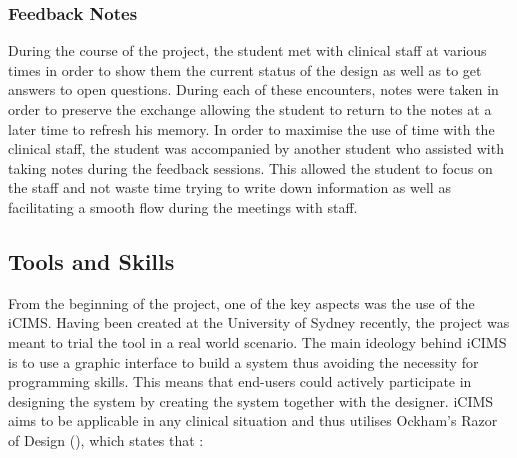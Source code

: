 \subsubsection{Feedback Notes}
During the course of the project, the student met with clinical staff at various times in order to show them the current status of the design as well as to get answers to open questions. During each of these encounters, notes were taken in order to preserve the exchange allowing the student to return to the notes at a  later time to refresh his memory. In order to maximise the use of time with the clinical staff, the student was accompanied by another student who assisted with taking notes during the feedback sessions. This allowed the student to focus on the staff and not waste time trying to write down information as well as facilitating a smooth flow during the meetings with staff.

\newpage
\subsection{Tools and Skills}
From the beginning of the project, one of the key aspects was the use of the \gls{iCIMS}.  Having been created at the University of Sydney recently, the project was meant to trial the tool in a real world scenario. The main ideology behind iCIMS is to use a graphic interface to build a system thus avoiding the necessity for programming skills. This means that end-users could actively participate in designing the system by creating the system together with the designer. iCIMS aims to be applicable in any clinical situation and thus utilises Ockham's Razor of Design (\cite{Budd}), which states that :

